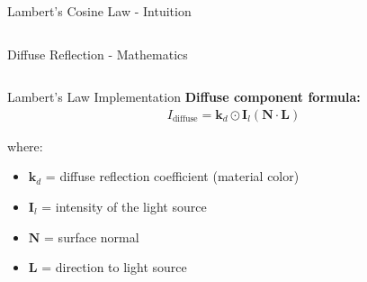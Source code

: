 \begin{frame}{Lambert's Cosine Law - Intuition}
\begin{columns}
\begin{column}{0.4\textwidth}
    \end{column}
  \end{columns}
\end{frame}

\begin{frame}{Diffuse Reflection - Mathematics}
  \begin{columns}
    \begin{column}{0.6\textwidth}
      \begin{mathbox}{Lambert's Law Implementation}
        \small
        \textbf{Diffuse component formula:}
        \begin{align*}
          I_{\text{diffuse}} = \mathbf{k}_d \odot \mathbf{I}_l (\mathbf{N} \cdot \mathbf{L})
        \end{align*}

        where:
        \begin{itemize}
          \item $\mathbf{k}_d$ = diffuse reflection coefficient (material color)
          \item $\mathbf{I}_l$ = intensity of the light source
          \item $\mathbf{N}$ = surface normal
          \item $\mathbf{L}$ = direction to light source
        \end{itemize}


\end{mathbox}
\end{column}
\end{columns}
\end{frame}
